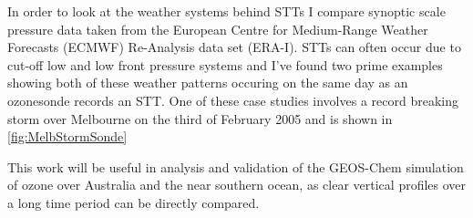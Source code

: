 In order to look at the weather systems behind STTs I compare synoptic scale pressure data taken from the European Centre for Medium-Range Weather Forecasts (ECMWF) Re-Analysis data set (ERA-I).
STTs can often occur due to cut-off low and low front pressure systems and I've found two prime examples showing both of these weather patterns occuring on the same day as an ozonesonde records an STT.
One of these case studies involves a record breaking storm over Melbourne on the third of February 2005 and is shown in \ref{fig:MelbStormSonde}

This work will be useful in analysis and validation of the GEOS-Chem simulation of ozone over Australia and the near southern ocean, as clear vertical profiles over a long time period can be directly compared.